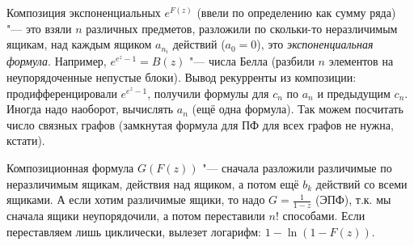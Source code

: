 \section{} %
	Композиция экспоненциальных $e^{F(z)}$ (ввели по определению как сумму ряда) "---
	это взяли $n$ различных предметов, разложили по скольки-то неразличимым ящикам, над каждым
	ящиком $a_{n_i}$ действий ($a_0 = 0$), это \textit{экспоненциальная формула}.
	Например, $e^{e^z-1}=B(z)$ "--- числа Белла (разбили $n$ элементов на неупорядоченные непустые блоки).
	Вывод рекурренты из композиции: продифференцировали $e^{e^z-1}$, получили формулы
	для $c_n$ по $a_n$ и предыдущим $c_n$.
	Иногда надо наоборот, вычислять $a_n$ (ещё одна формула).
	Так можем посчитать число связных графов (замкнутая формула для ПФ для всех графов не нужна, кстати).

	Композиционная формула $G(F(z))$ "--- сначала разложили различимые по неразличимым ящикам,
	действия над ящиком, а потом ещё $b_k$ действий со всеми ящиками.
	А если хотим различимые ящики, то надо $G=\frac{1}{1-z}$ (ЭПФ),
	т.к. мы сначала ящики неупорядочили, а потом переставили $n!$ способами.
	Если переставляем лишь циклически, вылезет логарифм: $1-\ln(1-F(z))$.

\section{} %
	\TODO

\section{} %
	\TODO
